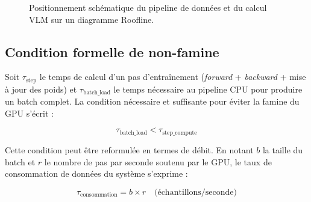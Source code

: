 \documentclass[12pt,a4paper]{report}
\begin{document}
\begin{figure}[htbp]
  \centering
  \caption{Positionnement schématique du pipeline de données et du calcul VLM sur un diagramme Roofline.}
  \label{fig:roofline}
\end{figure}

\subsection{Condition formelle de non-famine}

Soit $\tau_{\text{step}}$ le temps de calcul d'un pas d'entraînement (\textit{forward} + \textit{backward} + mise à jour des poids) et $\tau_{\text{batch\_load}}$ le temps nécessaire au pipeline CPU pour produire un batch complet. La condition nécessaire et suffisante pour éviter la famine du GPU s'écrit :

\begin{equation}
\label{eq:non_famine}
\tau_{\text{batch\_load}} < \tau_{\text{step\_compute}}
\end{equation}

Cette condition peut être reformulée en termes de débit. En notant $b$ la taille du batch et $r$ le nombre de pas par seconde soutenu par le GPU, le taux de consommation de données du système s'exprime :

\begin{equation}
\label{eq:consommation}
\tau_{\text{consommation}} = b \times r \quad \text{(échantillons/seconde)}
\end{equation}
\end{document}
